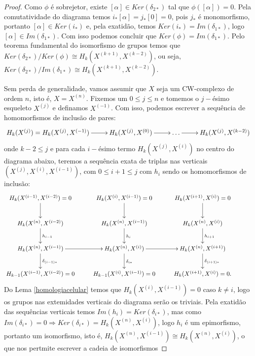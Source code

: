 \documentclass[12pt]{book}
\newcommand{\classe}[1]{[#1]}
\newcommand{\homologia}[2]{H_{#1}(#2)}
\newcommand{\homologiarel}[3]{H_{#1}(#2,#3)}
\newcommand{\homologiarelskele}[3]{H_{#1}(X^{(#2)}, X^{(#3)})}
\newcommand{\skeleton}[1]{X^{(#1)}}
\begin{document}
\begin{proof}
		Como $\phi$ é sobrejetor, existe $\classe{\alpha} \in Ker(\delta_{2*})$ tal que $\phi(\classe{\alpha}) = 0$. Pela comutatividade do diagrama temos $i_{*}{\classe{\alpha}} = j_{*}\classe{0} = 0$, pois $j_{*}$ é monomorfismo, portanto $\classe{\alpha} \in Ker(i_{*})$ e, pela exatidão, temos $Ker(i_{*})=Im(\delta_{1*})$, logo $\classe{\alpha} \in Im(\delta_{1*})$. Com isso podemos concluir que $Ker(\phi) = Im(\delta_{1*})$. Pelo teorema fundamental do isomorfismo de grupos temos que $Ker(\delta_{2*})/Ker(\phi) \cong \homologiarelskele{k}{k+1}{k-2}$, ou seja, $Ker(\delta_{2*})/Im(\delta_{1*}) \cong \homologiarelskele{k}{k+1}{k-2}$.
		
		Sem perda de generalidade, vamos assumir que $X$ seja um CW-complexo de ordem $n$, isto é, $X= \skeleton{n}$. Fixemos um $0 \leq j \leq n$ e tomemos o $j-$ésimo esqueleto $\skeleton{j}$ e definamos $\skeleton{-1}$. Com isso, podemos escrever a sequência de homomorfismos de inclusão de pares:
		$$
		\xymatrix{
			\homologia{k}{\skeleton{j}} = \homologiarel{k}{\skeleton{j}}{\skeleton{-1}}\ar[r]& \homologiarel{k}{\skeleton{j}}{\skeleton{0}} \ar[r] & \dots \ar[r] & \homologiarel{k}{\skeleton{j}}{\skeleton{k-2}}
		}
		$$
		onde $k-2 \leq j$ e para cada $i-$ésimo termo $\homologiarelskele{k}{j}{i}$ no centro do diagrama abaixo, teremos a sequência exata de triplas nas verticais $(\skeleton{j}, \skeleton{i}, \skeleton{i-1})$, com $0\leq i +1\leq j$ com $h_{i}$ sendo os homomorfismos de inclusão:
		$$
		\xymatrix{
			\homologiarel{k}{\skeleton{i-1}}{\skeleton{i-2}}=0 \ar[d] & \homologiarel{k}{\skeleton{i}}{\skeleton{i-1}}=0 \ar[d] & \homologiarel{k}{\skeleton{i+1}}{\skeleton{i}}=0 \ar[d] &	
			\\
			\homologiarel{k}{\skeleton{n}}{\skeleton{i-2}} \ar[d]^{h_{i-1}} & \homologiarel{k}{\skeleton{n}}{\skeleton{i-1}} \ar[d]^{h_{i}} & \homologiarel{k}{\skeleton{n}}{\skeleton{i}} \ar[d]^{h_{i+1}}
			\\
			\homologiarel{k}{\skeleton{n}}{\skeleton{i-1}} \ar[r]\ar[d]^{\delta_{(i-1)*}}& \homologiarel{k}{\skeleton{n}}{\skeleton{i}} \ar[r] \ar[d]^{\delta_{i*}} &  \homologiarel{k}{\skeleton{n}}{\skeleton{i+1}} \ar[d]^{\delta_{(i+1)*}} 
			\\
			\homologiarelskele{k-1}{i-1}{i-2}=0& \homologiarel{k-1}{\skeleton{i}}{\skeleton{i-1}}=0 &  \homologiarel{k}{\skeleton{i+1}}{\skeleton{i}}=0. &		
		}
		$$
		Do Lema \ref{homologiacelular} temos que $\homologiarelskele{k}{i}{i-1} =0$ caso $k \neq i$, logo os grupos nas extemidades verticais do diagrama serão os triviais. Pela exatidão das sequências verticais temos $Im(h_{i}) = Ker(\delta_{i*})$, mas como $Im(\delta_{i*}) = 0 \Rightarrow Ker(\delta_{i*}) = \homologiarel{k}{\skeleton{n}}{\skeleton{i}}$, logo $h_{i}$ é um epimorfismo, portanto um isomorfismo, isto é, $\homologiarel{k}{\skeleton{n}}{\skeleton{i-1}} \cong \homologiarel{k}{\skeleton{n}}{\skeleton{i}}$, o que nos pertmite escrever a cadeia de isomorfismos 

\end{proof}
\end{document}
